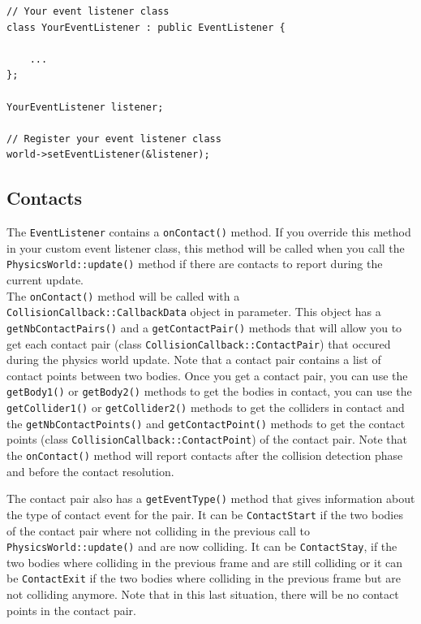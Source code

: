 \documentclass[a4paper,12pt]{article}
\begin{document}
    \begin{lstlisting}
// Your event listener class
class YourEventListener : public EventListener {

	...
};

YourEventListener listener;

// Register your event listener class
world->setEventListener(&listener);
  \end{lstlisting}

    \subsection{Contacts}

    \begin{sloppypar}
    The \texttt{EventListener} contains a \texttt{onContact()} method. If you override this method in your custom event listener class, this method will
    be called when you call the \texttt{PhysicsWorld::update()} method if there are contacts to report during the current update. \\

    The \texttt{onContact()} method will be called with a \texttt{CollisionCallback::CallbackData} object in parameter. This object has a
    \texttt{getNbContactPairs()} and a \texttt{getContactPair()} methods that will allow you to get each contact pair (class
    \texttt{CollisionCallback::ContactPair}) that occured during the physics world update. Note that a contact pair contains a list of contact
    points between two bodies. Once you get a contact pair, you can use the \texttt{getBody1()} or \texttt{getBody2()} methods to get the bodies in
    contact, you can use the \texttt{getCollider1()} or \texttt{getCollider2()} methods to get the colliders in contact and the
    \texttt{getNbContactPoints()} and \texttt{getContactPoint()} methods to get the contact points (class \texttt{CollisionCallback::ContactPoint}) 
    of the contact pair. Note that the \texttt{onContact()} method will report contacts after the collision detection phase and before the contact
    resolution. \\
    \end{sloppypar}

    \begin{sloppypar}
    The contact pair also has a \texttt{getEventType()} method that gives information about the type of contact event for the pair. It can be
    \texttt{ContactStart} if the two bodies of the contact pair where not colliding in the previous call to \texttt{PhysicsWorld::update()} and are now
    colliding. It can be \texttt{ContactStay}, if the two bodies where colliding in the previous frame and are still colliding or it can be
    \texttt{ContactExit} if the two bodies where colliding in the previous frame but are not colliding anymore. Note that in this last situation, there
    will be no contact points in the contact pair. \\
    \end{sloppypar}
\end{document}
